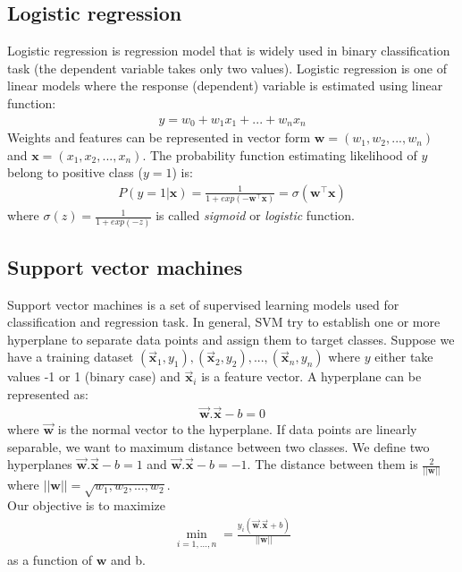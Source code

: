 \subsection{Logistic regression}
Logistic regression is regression model that is widely used in binary classification task (the dependent variable takes only two values). Logistic regression is one of linear models where the response (dependent) variable is estimated using linear function:
\begin{eqnarray*}
y = w_0 + w_1x_1 + ... + w_nx_n
\end{eqnarray*}
Weights and features can be represented in vector form $\textbf{w} = (w_1, w_2,...,w_n)$ and $\textbf{x} = (x_1, x_2,...,x_n)$. The probability function estimating likelihood of $y$ belong to positive class ($y = 1$) is:
\begin{eqnarray*}
P(y = 1 | \textbf{x}) = \frac{1}{1+exp(-\textbf{w}^\intercal\textbf{x})} = \sigma(\textbf{w}^\intercal\textbf{x})
\end{eqnarray*}
where $\sigma(z) = \frac{1}{1 + exp(-z)}$ is called \textit{sigmoid} or \textit{logistic} function.

\subsection{Support vector machines}
Support vector machines is a set of supervised learning models used for classification and regression task. In general, SVM try to establish one or more hyperplane to separate data points and assign them to target classes. Suppose we have a training dataset $(\vec{\bm{x}}_1, y_1), (\vec{\bm{x}}_2, y_2),...,(\vec{\bm{x}}_n, y_n)$ where $y$ either take values -1 or 1 (binary case) and $\vec{\bm{x}}_i$ is a feature vector. A hyperplane can be represented as:
\begin{eqnarray*}
\vec{\bm{w}} . \vec{\bm{x}} - b = 0
\end{eqnarray*}
where $\vec{\bm{w}}$ is the normal vector to the hyperplane. If data points are linearly separable, we want to maximum distance between two classes. We define two hyperplanes $\vec{\bm{w}} . \vec{\bm{x}} - b = 1$ and $\vec{\bm{w}} . \vec{\bm{x}} - b = -1$. The distance between them is $\frac{2}{||\textbf{w}||}$ where $||\textbf{w}|| = \sqrt{w_1, w_2,...,w_2}$.\\
Our objective is to maximize
\begin{eqnarray*}
\min_{i = 1,\dots,n} = \frac{y_i(\vec{\bm{\textbf{w}}} . \vec{\bm{\textbf{x}}}+b)}{||\textbf{w}||}
\end{eqnarray*}
as a function of $\textbf{w}$ and b.\\





